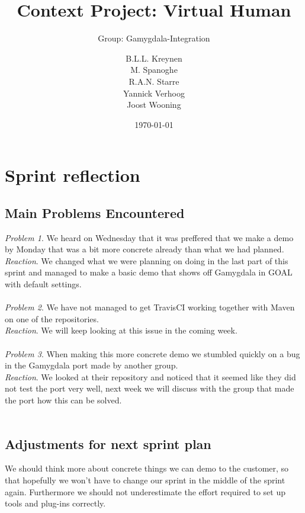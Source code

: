 \documentclass{scrartcl}
\begin{document}
\title{Context Project: Virtual Human}
\subtitle{Group: Gamygdala-Integration}
\date{\today{}}

\author{
    \begin{tabular}{l r}
      B.L.L. Kreynen\\
      M. Spanoghe\\
      R.A.N. Starre\\
      Yannick Verhoog\\
      Joost Wooning\\
    \end{tabular}
}

\maketitle \thispagestyle{empty} \pagebreak

\section{Sprint reflection}

\subsection{Main Problems Encountered}

\emph{Problem 1}. We heard on Wednesday that it was preffered that we make a demo by Monday that was a bit more concrete already than what we had planned.\\
\emph{Reaction}. We changed what we were planning on doing in the last part of this sprint and managed to make a basic demo that shows off Gamygdala in GOAL with default settings.\\
\\
\emph{Problem 2}. We have not managed to get TravisCI working together with Maven on one of the repositories.\\
\emph{Reaction}. We will keep looking at this issue in the coming week.\\
\\
\emph{Problem 3}. When making this more concrete demo we stumbled quickly on a bug in the Gamygdala port made by another group.\\
\emph{Reaction}. We looked at their repository and noticed that it seemed like they did not test the port very well, next week we will discuss with the group that made the port how this can be solved.\\
\\


\subsection{Adjustments for next sprint plan}
We should think more about concrete things we can demo to the customer, so that hopefully we won't have to change our sprint in the middle of the sprint again. Furthermore we should not underestimate the effort required to set up tools and plug-ins correctly.
\end{document}
